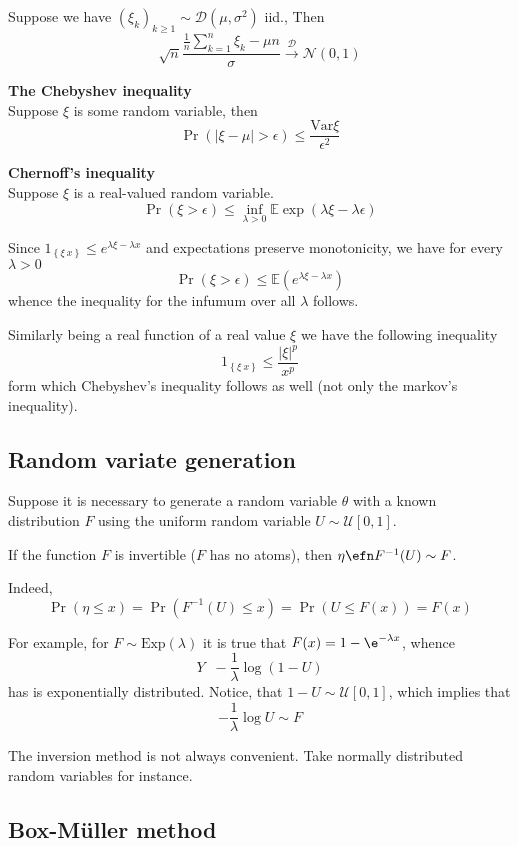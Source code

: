 \documentclass[a4paper]{article}
\newcommand{\obj}[1]{{\left\{ #1 \right \}}}
\newcommand{\clo}[1]{{\left [ #1 \right ]}}
\newcommand{\brac}[1]{{\left ( #1 \right )}}
\newcommand{\abs}[1]{{\left | #1 \right |}}
\newcommand{\Ex}{\mathbb{E}}
\newcommand{\Var}{\text{Var}}
\newcommand{\defn}{\mathop{\overset{\Delta}{=}}\nolimits}
\begin{document}
Suppose we have $\brac{\xi_k}_{k\geq1}\sim \mathcal{D}(\mu, \sigma^2)$ iid., Then
\[\sqrt{n}\frac{\frac{1}{n}\sum_{k=1}^n \xi_k - \mu n}{\sigma} \overset{\mathcal{D}}{\to} \mathcal{N}(0,1)\]

\noindent\textbf{The Chebyshev inequality}\hifll\\
Suppose $\xi$ is some random variable, then 
\[\Pr\brac{\abs{\xi-\mu}> \epsilon}\leq \frac{\Var{\xi}}{\epsilon^2}\] 

\noindent\textbf{Chernoff's inequality}\hfill\\
Suppose $\xi$ is a real-valued random variable.
\[\Pr\brac{\xi>\epsilon}\leq \inf_{\lambda>0} \Ex\exp\brac{\lambda\xi - \lambda\epsilon}\]

Since $1_\obj{\xi\>x}\leq e^{\lambda \xi - \lambda x}$ and expectations preserve monotonicity, we have for every $\lambda>0$
\[\Pr\brac{\xi>\epsilon}\leq \Ex\brac{e^{\lambda \xi - \lambda x}}\]
whence the inequality for the infumum over all $\lambda$ follows.

Similarly being a real function of a real value $\xi$ we have the following inequality
\[1_\obj{\xi\>x}\leq \frac{\abs{\xi}^p}{x^p}\]
form which Chebyshev's inequality follows as well (not only the markov's inequality).

\subsection{Random variate generation} %
\label{sub:random_variate_generation}

Suppose it is necessary to generate a random variable $\theta$ with a known distribution $F$ using the uniform random variable $U\sim\mathcal{U}\clo{0,1}$.

If the function $F$ is invertible ($F$ has no atoms), then $\eta \efn F^{-1}(U)\sim F$.

Indeed, \[\Pr\brac{\eta\leq x} = \Pr\brac{F^{-1}(U)\leq x} = \Pr\brac{U\leq F(x)} = F(x)\]

For example, for $F\sim \text{Exp}(\lambda)$ it is true that $F(x)= 1-\e^{-\lambda x}$, whence \[Y \defn -\frac{1}{\lambda}\log{(1-U)}\] has is exponentially distributed. Notice, that $1-U\sim\mathcal{U}\clo{0,1}$, which implies that \[-\frac{1}{\lambda}\log U \sim F\]

The inversion method is not always convenient. Take normally distributed random variables for instance.


\subsection{Box-M\"uller method} %
\label{sub:box_muller_method}
\end{document}
